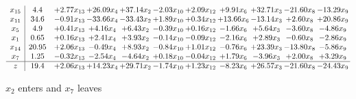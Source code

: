 \documentclass[9pt]{article}
\begin{document}
 \[\begin{array}{c| c c@{\hskip 2pt} c@{\hskip 2pt} c@{\hskip 2pt} c@{\hskip 2pt} c@{\hskip 2pt} c@{\hskip 2pt} c@{\hskip 2pt} c@{\hskip 2pt} c@{\hskip 2pt} }
 x_{15}   &  4.4 & +  2.77 x_{13} & + 26.09 x_{4} & + 37.14 x_{2} & -2.03 x_{10} & +  2.09 x_{12} & +  9.91 x_{6} & + 32.71 x_{3} & -21.60 x_{8} & -13.29 x_{9}\\
 x_{11}   &  34.6 & -0.91 x_{13} & -33.66 x_{4} & -33.43 x_{2} & +  1.89 x_{10} & +  0.34 x_{12} & + 13.66 x_{6} & -13.14 x_{3} & +  2.60 x_{8} & + 20.86 x_{9}\\
 x_{5}   &  4.9 & +  0.41 x_{13} & +  4.16 x_{4} & +  6.43 x_{2} & -0.39 x_{10} & +  0.16 x_{12} & -1.66 x_{6} & +  5.64 x_{3} & -3.60 x_{8} & -4.86 x_{9}\\
 x_{1}   &  0.65 & +  0.16 x_{13} & +  2.41 x_{4} & +  3.93 x_{2} & -0.14 x_{10} & -0.09 x_{12} & -2.16 x_{6} & +  2.89 x_{3} & -0.60 x_{8} & -2.86 x_{9}\\
 x_{14}   &  20.95 & +  2.06 x_{13} & -0.49 x_{4} & +  8.93 x_{2} & -0.84 x_{10} & +  1.01 x_{12} & -0.76 x_{6} & + 23.39 x_{3} & -13.80 x_{8} & -5.86 x_{9}\\
 x_{7}   &  1.25 & -0.32 x_{13} & -2.54 x_{4} & -4.64 x_{2} & +  0.18 x_{10} & -0.04 x_{12} & +  1.79 x_{6} & -3.96 x_{3} & +  2.00 x_{8} & +  3.29 x_{9}\\
\hline
z    &  19.4 & +  2.06 x_{13} & + 14.23 x_{4} & + 29.71 x_{2} & -1.74 x_{10} & +  1.23 x_{12} & -8.23 x_{6} & + 26.57 x_{3} & -21.60 x_{8} & -24.43 x_{9}\\
\end{array}\]


 $ x_{2} $ enters and $ x_{7} $ leaves 
\end{document}
